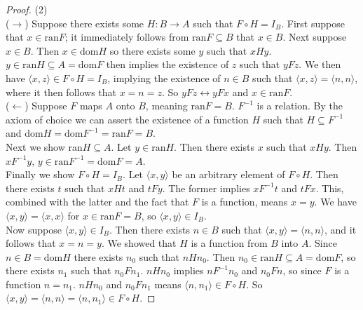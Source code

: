 \documentclass{report}
\begin{document}
\begin{proof}(2)\\
\indent($\rightarrow$)
Suppose there exists some $H:B\to A$ such that $F\circ H=I_B$. First suppose that $x\in\text{ran}F$; it immediately follows from $\text{ran}F\subseteq B$ that $x\in B$. Next suppose $x\in B$. Then
$x\in\text{dom}H$ so there exists some $y$ such that $xHy$. $y\in\text{ran}H\subseteq A=\text{dom}F$ then implies the existence of $z$ such that $yFz$.
We then have $\langle x,z\rangle\in F\circ H=I_B$, implying the existence of $n\in B$ such that $\langle x,z\rangle=\langle n,n\rangle$, where it then follows that $x=n=z$. 
So $yFz\leftrightarrow yFx$ and $x\in\text{ran}F$.\\
\indent($\leftarrow$) Suppose $F$ maps $A$ onto $B$, meaning $\text{ran}F=B$. $F^{-1}$ is a relation. 
By the axiom of choice we can assert the existence of a function $H$ such that $H\subseteq F^{-1}$
and dom$H=\text{dom}F^{-1}=\text{ran}F=B$.\\
\indent Next we show ran$H\subseteq A$. Let $y\in\text{ran}H$. Then there exists $x$ such that $xHy$. Then $xF^{-1}y$, $y\in\text{ran}F^{-1}=\text{dom}F=A$.\\
\indent Finally we show $F\circ H=I_B$. Let $\langle x,y\rangle$ be an arbitrary element of $F\circ H$. Then there exists $t$ such that $xHt$ and $tFy$. The former implies $xF^{-1}t$ and $tFx$. 
This, combined with the latter and the fact that $F$ is a function, means $x=y$. 
We have $\langle x,y\rangle=\langle x,x\rangle$ for $x\in\text{ran}F=B$, so $\langle x,y\rangle\in I_B$.\\
\indent Now suppose $\langle x,y\rangle\in I_B$. Then there exists $n\in B$ such that $\langle x,y\rangle=\langle n,n\rangle$, and it follows that $x=n=y$. We showed that $H$ is a function from
$B$ into $A$.
Since $n\in B=\text{dom}H$ there exists $n_0$ such that $nHn_0$. Then $n_0\in\text{ran}H\subseteq A=\text{dom}F$, so there exists $n_1$ such that $n_0Fn_1$.
$nHn_0$ implies $nF^{-1}n_0$ and $n_0Fn$, so since $F$ is a function $n=n_1$.
$nHn_0$ and $n_0Fn_1$ means $\langle n,n_1\rangle\in F\circ H$. 
So $\langle x,y\rangle=\langle n,n\rangle=\langle n,n_1\rangle\in F\circ H$.
\end{proof}
\newpage
\end{document}
